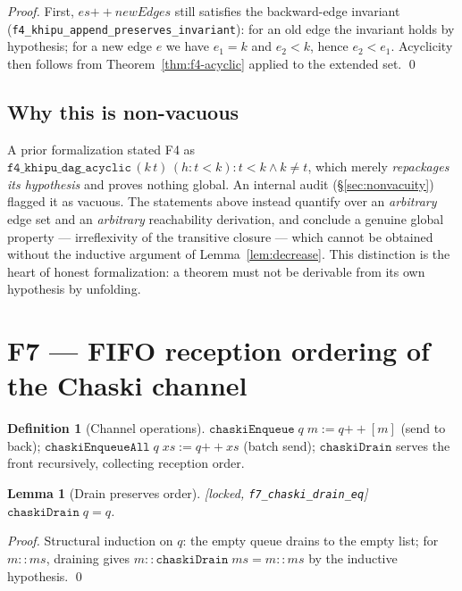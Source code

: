 \documentclass[11pt,letterpaper]{article}
\newtheorem{lemma}[theorem]{Lemma}
\theoremstyle{definition}
\newtheorem{definition}[theorem]{Definition}
\begin{document}
\begin{proof}
First, $es \mathbin{+\!\!+} \mathit{newEdges}$ still satisfies the backward-edge
invariant (\nolinkurl{f4_khipu_append_preserves_invariant}): for an old edge the
invariant holds by hypothesis; for a new edge $e$ we have $e_1 = k$ and
$e_2 < k$, hence $e_2 < e_1$. Acyclicity then follows from
Theorem~\ref{thm:f4-acyclic} applied to the extended set. \qed
\end{proof}

\subsection{Why this is non-vacuous}

A prior formalization stated F4 as
$\texttt{f4\_khipu\_dag\_acyclic}\,(k\,t)\,(h:t<k) : t<k \wedge k\neq t$, which
merely \emph{repackages its hypothesis} and proves nothing global. An internal
audit (\S\ref{sec:nonvacuity}) flagged it as vacuous. The statements above
instead quantify over an \emph{arbitrary} edge set and an \emph{arbitrary}
reachability derivation, and conclude a genuine global property ---
irreflexivity of the transitive closure --- which cannot be obtained without the
inductive argument of Lemma~\ref{lem:decrease}. This distinction is the heart of
honest formalization: a theorem must not be derivable from its own hypothesis by
unfolding.

\section{F7 --- FIFO reception ordering of the Chaski channel}\label{sec:f7}

\begin{definition}[Channel operations]
$\texttt{chaskiEnqueue}\;q\;m := q \mathbin{+\!\!+} [m]$ (send to back);
$\texttt{chaskiEnqueueAll}\;q\;xs := q \mathbin{+\!\!+} xs$ (batch send);
$\texttt{chaskiDrain}$ serves the front recursively, collecting reception order.
\end{definition}

\begin{lemma}[Drain preserves order]\label{lem:drain}
\emph{[locked, \texttt{f7\_chaski\_drain\_eq}]} $\texttt{chaskiDrain}\;q = q$.
\end{lemma}

\begin{proof}
Structural induction on $q$: the empty queue drains to the empty list; for
$m :: ms$, draining gives $m :: \texttt{chaskiDrain}\;ms = m :: ms$ by the
inductive hypothesis. \qed
\end{proof}
\end{document}
